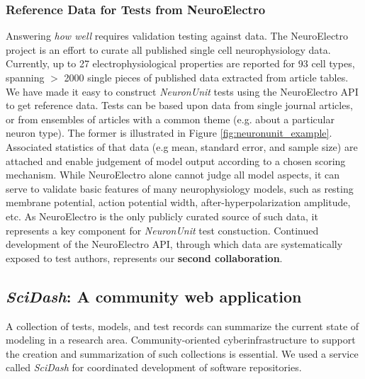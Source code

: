 \documentclass[11pt,letterpaper]{article}
\begin{document}
\subsubsection{Reference Data for Tests from NeuroElectro}
Answering \textit{how well} requires validation testing against data. 
The NeuroElectro project\cite{neuroelectro_url} is an effort to curate all published single cell neurophysiology data\cite{tripathy_neuroelectro:_2012}.  
Currently, up to 27 electrophysiological properties are reported for 93 cell types, spanning $>$ 2000 single pieces of published data extracted from article tables. 
We have made it easy to construct \textit{NeuronUnit} tests using the NeuroElectro API to get reference data. 
Tests can be based upon data from single journal articles, or from ensembles of articles with a common theme (e.g. about a particular neuron type). 
The former is illustrated in Figure \ref{fig:neuronunit_example}. 
Associated statistics of that data (e.g mean, standard error, and sample size) are attached and enable judgement of model output according to a chosen scoring mechanism. 
While NeuroElectro alone cannot judge all model aspects, it can serve to validate basic features of many neurophysiology models, such as resting membrane potential, action potential width, after-hyperpolarization amplitude, etc. 
As NeuroElectro is the only publicly curated source of such data, it represents a key component for \textit{NeuronUnit} test constuction.  
Continued development of the NeuroElectro API, through which data are systematically exposed to test authors, represents our \textbf{second collaboration}\cite{neuroelectro_dev_url}.  

\subsection{\textit{SciDash}: A community web application}\label{sec:scidash}
A collection of tests, models, and test records can summarize the current state of modeling in a research area.  
Community-oriented cyberinfrastructure to support the creation and summarization of such collections is essential.
We used a service called \textit{SciDash} \cite{scidash_url} for coordinated development of software repositories.
\end{document}
